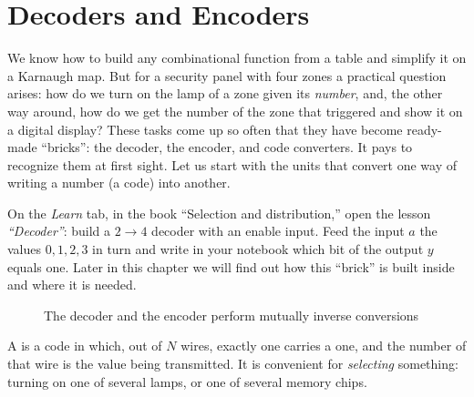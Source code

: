 \chapter{Decoders and Encoders}
\label{ch:coders}

We know how to build any combinational function from a table and simplify it on a
Karnaugh map. But for a security panel with four zones a practical
question arises: how do we turn on the lamp of a zone given its \emph{number}, and, the other way around,
how do we get the number of the zone that triggered and show it
on a digital display? These tasks come up so often that they have become
ready-made ``bricks'': the decoder, the encoder, and code converters. It pays
to recognize them at first sight. Let us start with the units that convert one
way of writing a number (a code) into another.

\begin{buildbox}
On the \emph{Learn} tab, in the book ``Selection and distribution,'' open the lesson
\emph{``Decoder''}: build a $2\to4$ decoder with an enable input.
Feed the input $a$ the values $0,1,2,3$ in turn and write in your notebook which bit
of the output $y$ equals one. Later in this chapter we will find out how this
``brick'' is built inside and where it is needed.
\end{buildbox}

\begin{figure}[H]
\centering
{}
\caption{The decoder and the encoder perform mutually inverse conversions}
\end{figure}

A  is a code in which, out of $N$
wires, exactly one carries a one, and the number of that wire is the
value being transmitted. It is convenient for \emph{selecting} something: turning on one of
several lamps, or one of several memory chips.

